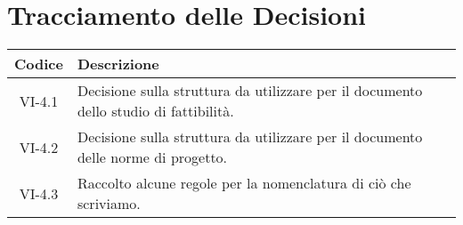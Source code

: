 \section*{Tracciamento delle Decisioni}

\begin{center}
	\begin{longtable}{|c|p{14.5cm}|}
	\hline
	\rowcolor{lighter-grayer}
	\textbf{Codice} & \textbf{Descrizione} \\
	\hline
	\endfirsthead

	\hline
	VI-4.1 & Decisione sulla struttura da utilizzare per il documento dello studio di fattibilità. \\
	VI-4.2 & Decisione sulla struttura da utilizzare per il documento delle norme di progetto. \\
	VI-4.3 & Raccolto alcune regole per la nomenclatura di ciò che scriviamo. \\
	\hline

	\end{longtable}
\end{center}
